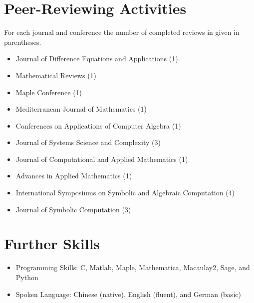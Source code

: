 \documentclass[a4paper,12pt]{article}
\begin{document}
\section*{\Large Peer-Reviewing Activities}
For each journal and conference the number of completed reviews in given in parentheses.
\begin{itemize}
\item Journal of Difference Equations and Applications (1)
\item Mathematical Reviews (1)
\item Maple Conference (1)
\item Mediterranean Journal of Mathematics (1)
\item Conferences on Applications of Computer Algebra (1)
 \item Journal of Systems Science and Complexity (3)
 \item Journal of Computational and Applied Mathematics (1)
 \item Advances in Applied Mathematics (1)
 \item International Symposiums on Symbolic and Algebraic Computation (4)
 \item Journal of Symbolic Computation (3)
\end{itemize}

\section*{\Large{Further Skills}}
\begin{itemize}
 \item Programming Skills: C, Matlab, Maple, Mathematica, Macaulay2, Sage, and Python
 \item Spoken Language: Chinese (native), English (fluent), and German (basic)
\end{itemize}

\end{document}
